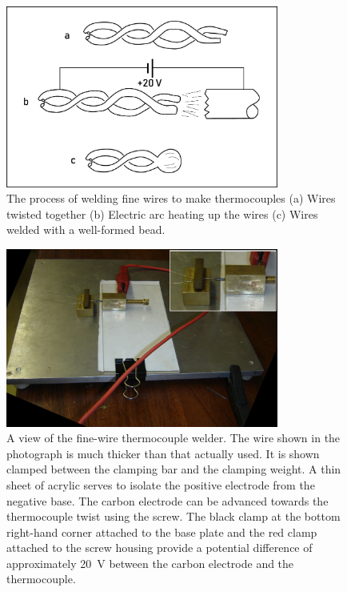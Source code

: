 \begin{figure}
	\centering
	\includegraphics[width=0.8\textwidth]{Figures/TCWelding}
	\decoRule

\caption[Welding process schematic]{The process of welding fine wires to make
thermocouples (a) Wires twisted together (b) Electric arc heating up the wires
(c) Wires welded with a well-formed bead. }

\label{fig:WeldingSteps}
\end{figure}


\begin{figure}
	\centering
	\includegraphics[width=0.8\textwidth]{Figures/Welder3.jpg}
	\decoRule

\caption[Fine-wire welder]{A view of the fine-wire thermocouple welder. The wire
shown in the photograph is much thicker than that actually used. It is shown
clamped between the clamping bar and the clamping weight. A thin sheet of
acrylic serves to isolate the positive electrode from the negative base. The
carbon electrode can be advanced towards the thermocouple twist using the screw.
The black clamp at the bottom right-hand corner attached to the base plate and
the red clamp attached to the screw housing provide a potential difference of
approximately \SI{20}{V} between the carbon electrode and the thermocouple.}


\label{fig:FineWireWelder}
\end{figure}



